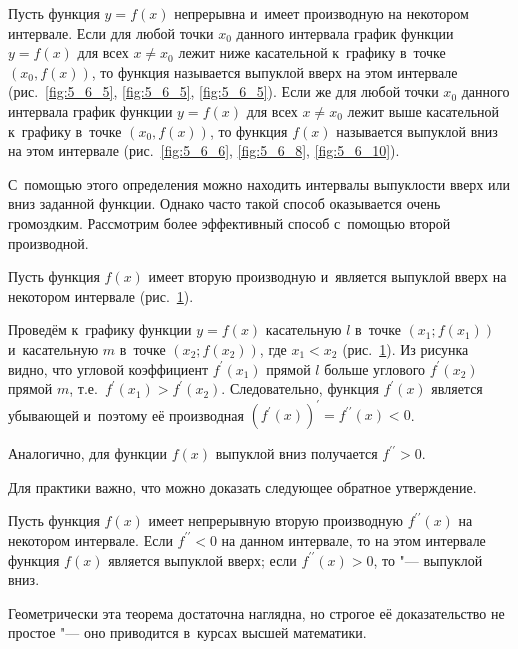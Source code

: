 Пусть функция $y = f(x)$ непрерывна и~имеет производную на некотором интервале.
Если для любой точки $x_{0}$ данного интервала график функции $y = f(x)$ для всех
$x \ne x_{0}$ лежит ниже касательной к~графику в~точке $(x_{0}, f(x))$,
то функция называется выпуклой вверх на этом интервале
(рис.\ \ref{fig:5_6_5}, \ref{fig:5_6_5}, \ref{fig:5_6_5}).
Если же для любой точки $x_{0}$ данного интервала график функции $y = f(x)$
для всех $x \ne x_{0}$ лежит выше касательной к~графику в~точке $(x_{0}, f(x))$,
то функция $f(x)$ называется выпуклой вниз на этом интервале
(рис.\ \ref{fig:5_6_6}, \ref{fig:5_6_8}, \ref{fig:5_6_10}).

С~помощью этого определения можно находить интервалы выпуклости вверх или вниз
заданной функции. Однако часто такой способ оказывается очень громоздким.
Рассмотрим более эффективный способ с~помощью второй производной.

Пусть функция $f(x)$ имеет вторую производную и~является выпуклой вверх
на некотором интервале (рис.\ \ref{fig:5_6_11}).

\begin{figure}\label{fig:5_6_11}
\end{figure}

Проведём к~графику функции $y = f(x)$ касательную $l$ в~точке $(x_{1}; f(x_{1}))$
и~касательную $m$ в~точке $(x_{2}; f(x_{2}))$,
где $x_{1} < x_{2}$ (рис.\ \ref{fig:5_6_11}).
Из рисунка видно, что угловой коэффициент $f^\prime(x_{1})$ прямой $l$
больше углового $f^\prime (x_{2})$ прямой $m$, т.е.\ $f^\prime (x_{1}) > f^\prime (x_{2})$.
Следовательно, функция $f^\prime (x)$ является убывающей и~поэтому её производная
$\left( f^\prime (x) \right)^\prime = f^{\prime\prime} (x) < 0$.

Аналогично, для функции $f(x)$ выпуклой вниз получается $f^{\prime\prime} > 0$.

Для практики важно, что можно доказать следующее обратное утверждение.

\begin{Th}\label{th:5_6_2_1}
Пусть функция $f(x)$ имеет непрерывную вторую производную $f^{\prime\prime} (x)$
на некотором интервале. Если $f^{\prime\prime} < 0$ на данном интервале,
то на этом интервале функция $f(x)$ является выпуклой вверх;
если $f^{\prime\prime} (x) > 0$, то "--- выпуклой вниз.
\end{Th}

Геометрически эта теорема достаточна наглядна, но строгое её доказательство
не простое "--- оно приводится в~курсах высшей математики.

